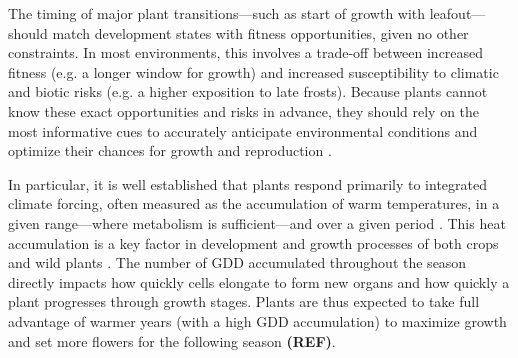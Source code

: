 \documentclass[11pt,letter]{article}
\begin{document}
The timing of major plant transitions---such as start of growth with leafout---should match development states with fitness opportunities, given no other constraints. In most environments, this involves a trade-off between increased fitness (e.g. a longer window for growth) and increased susceptibility to climatic and biotic risks (e.g. a higher exposition to late frosts). Because plants cannot know these exact opportunities and risks in advance, they should rely on the most informative cues to accurately anticipate environmental conditions and optimize their chances for growth and reproduction \citep{Chevin2015, Bonamour2019}.

In particular, it is well established that plants respond primarily to integrated climate forcing, often measured as the accumulation of warm temperatures, in a given range---where metabolism is sufficient---and over a given period \citep[growing degree-days or GDD;][]{Chuine2017}. %
This heat accumulation is a key factor in development and growth processes of both crops \citep[e.g.][]{Cross1972} and wild plants \citep[e.g.][]{Hunter1992}. The number of GDD accumulated throughout the season directly impacts how quickly cells elongate to form new organs and how quickly a plant progresses through growth stages. Plants are thus expected to take full advantage of warmer years (with a high GDD accumulation) to maximize growth and set more flowers for the following season \textbf{(REF)}. %
\end{document}
